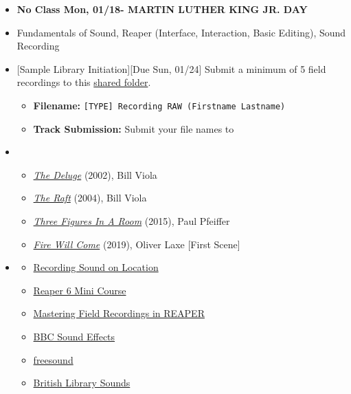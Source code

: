 \def\dMon{Mon, 01/18}
\def\dTues{Tues, 01/19}
\def\dWed{Wed, 01/20}
\def\dThur{Thur, 01/21}
\def\dFri{Fri, 01/22}
\def\dSat{Sat, 01/23}
\def\dSun{Sun, 01/24}
\placeDate

\begin{itemize}[noitemsep,topsep=0pt,leftmargin=*]
	\item \textcolor{defaultColor}{\textbf{No Class \dMon - MARTIN LUTHER KING JR. DAY}}

	\item {} Fundamentals of Sound, Reaper (Interface, Interaction, Basic Editing), Sound Recording
	\item {}[Sample Library Initiation][Due \dSun] \newline
	      Submit a minimum of 5 field recordings to this \href{\samplelibInitURL}{shared folder}.
	      \begin{itemize}
		      \item \textbf{Filename:} \texttt{[TYPE] Recording RAW (Firstname Lastname)}
		      \item \textbf{Track Submission:} Submit your file names to \discordE
	      \end{itemize}
	\item {}
	      \begin{itemize}
		      \item \href{https://www.youtube.com/watch?v=t3VoMuwBPAE}{\emph{The Deluge}} (2002), Bill Viola
		      \item \href{https://www.youtube.com/watch?v=4Ili9pvlxdk}{\emph{The Raft}} (2004), Bill Viola
		      \item \href{https://paul-pfeiffer.com/three-figures-in-a-room}{\emph{Three Figures In A Room}} (2015), Paul Pfeiffer
		      \item \href{https://drive.google.com/drive/folders/1gVKTy4g6NgiLHdrMbCHSF4zTydVyF7jy}{\emph{Fire Will Come}} (2019), Oliver Laxe [First Scene]
	      \end{itemize}
	\item {}
	      \begin{resenv}
		      \begin{itemize}
			      \item \href{https://www.youtube.com/watch?v=TKBzjSSaKXU}{Recording Sound on Location}
			      \item \href{https://www.youtube.com/playlist?list=PLM0xHqxaiT6-plorG47t3balft4nVki39}{Reaper 6 Mini Course}
			      \item \href{https://www.youtube.com/watch?v=7BfWqRapF5E}{Mastering Field Recordings in REAPER}
			      \item \href{https://sound-effects.bbcrewind.co.uk/}{BBC Sound Effects}
			      \item \href{https://freesound.org/}{freesound}
			      \item \href{https://sounds.bl.uk/}{British Library Sounds}
		      \end{itemize}
	      \end{resenv}
\end{itemize}
